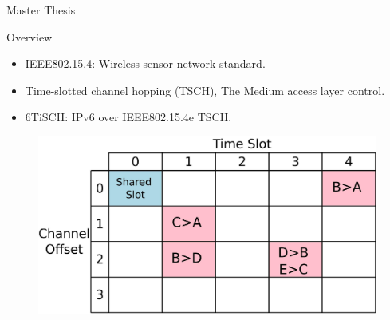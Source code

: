 \documentclass{beamer}
\begin{document}
\begin{frame}{Master Thesis}

\begin{minipage}[t]{0.48\linewidth}

\begin{block}{Overview}
    \begin{itemize}
    \item IEEE802.15.4: Wireless sensor network standard. 
    \item<2-> Time-slotted channel hopping (TSCH), The Medium access layer control.  
     \item<3-> 6TiSCH: IPv6 over IEEE802.15.4e TSCH. 
     \end{itemize}
    \end{block}
\end{minipage}\hfill
\begin{minipage}[t]{0.48\linewidth}
\centering
\begin{figure}[p]

\item<2-> \includegraphics[width=\linewidth]{TSCH.jpeg}

\end{figure}

\end{minipage}
\end{frame}
\end{document}
